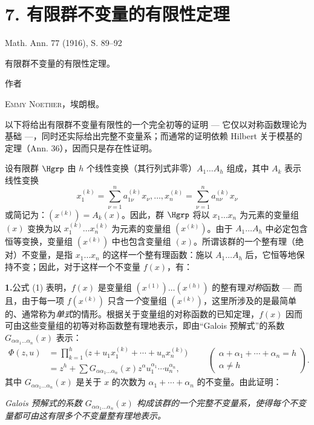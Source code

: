 \section*{7. 有限群不变量的有限性定理}
\begin{center}
Math. Ann. 77 (1916), S. 89--92
\end{center}

\begin{center}
{\Large 有限群不变量的有限性定理。}\par
\vspace{1.2em}
作者\par
\vspace{0.8em}
{\scshape Emmy Noether}，埃朗根。
\end{center}

以下将给出有限群不变量有限性的一个完全初等的证明 --- 它仅以对称函数理论为基础 ---，同时还实际给出完整不变量系；而通常的证明依赖 Hilbert 关于模基的定理（Ann. 36），因而只是存在性证明。

设有限群 $\Hgrp$ 由 $h$ 个线性变换（其行列式非零）$A_1\ldots A_h$ 组成，其中 $A_k$ 表示线性变换
\[
  x_1^{(k)}=\sum_{\nu=1}^{n}a_{1\nu}^{(k)}x_\nu,\ldots,
  x_n^{(k)}=\sum_{\nu=1}^{n}a_{n\nu}^{(k)}x_\nu
\]
或简记为：$(x^{(k)})=A_k(x)$。因此，群 $\Hgrp$ 将以 $x_1\ldots x_n$ 为元素的变量组 $(x)$ 变换为以 $x_1^{(k)}\ldots x_n^{(k)}$ 为元素的变量组 $(x^{(k)})$。由于 $A_1\ldots A_h$ 中必定包含恒等变换，变量组 $(x^{(k)})$ 中也包含变量组 $(x)$。所谓该群的一个整有理（绝对）不变量，是指 $x_1\ldots x_n$ 的这样一个整有理函数：施以 $A_1\ldots A_h$ 后，它恒等地保持不变；因此，对于这样一个不变量 $f(x)$，有：

\noindent\textbf{1.}\enspace 公式 (1) 表明，$f(x)$ 是变量组 $(x^{(1)})\ldots(x^{(h)})$ 的整有理\emph{对称}函数 --- 而且，由于每一项 $f(x^{(k)})$ 只含\emph{一个}变量组 $(x^{(k)})$，这里所涉及的是最简单的、通常称为\emph{单式}的情形。根据关于变量组的对称函数的已知定理，$f(x)$ 因而可由这些变量组的初等对称函数整有理地表示，即由“Galois 预解式”的系数 $G_{\alpha\alpha_1\ldots\alpha_n}(x)$ 表示：
\[
\begin{aligned}
  \Phi(z,u)
  &=\prod_{k=1}^{h}\bigl(z+u_1x_1^{(k)}+\cdots+u_nx_n^{(k)}\bigr) \\
  &=z^h+
    \sum G_{\alpha\alpha_1\ldots\alpha_n}(x)
    z^{\alpha}u_1^{\alpha_1}\cdots u_n^{\alpha_n},
\end{aligned}
\qquad
\left(\begin{array}{c}
\alpha+\alpha_1+\cdots+\alpha_n=h\\
\alpha\ne h
\end{array}\right).
\]
其中 $G_{\alpha\alpha_1\ldots\alpha_n}(x)$ 是关于 $x$ 的次数为 $\alpha_1+\cdots+\alpha_n$ 的不变量。由此证明：

\emph{Galois 预解式的系数 $G_{\alpha\alpha_1\ldots\alpha_n}(x)$ 构成该群的一个完整不变量系，使得每个不变量都可由这有限多个不变量整有理地表示。}
